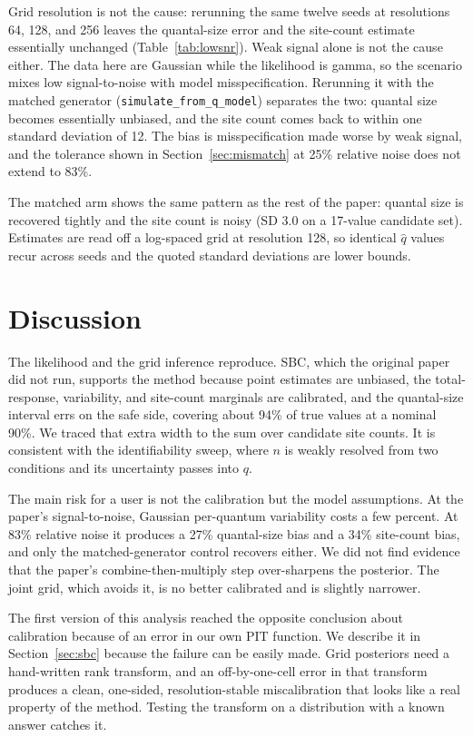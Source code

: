 \documentclass[a4paper, oneside, 10pt]{article}
\begin{document}
Grid resolution is not the cause: rerunning the same twelve seeds at resolutions 64, 128, and 256 leaves the quantal-size error and the site-count estimate essentially unchanged (Table~\ref{tab:lowsnr}). Weak signal alone is not the cause either. The data here are Gaussian while the likelihood is gamma, so the scenario mixes low signal-to-noise with model misspecification. Rerunning it with the matched generator (\texttt{simulate\_from\_q\_model}) separates the two: quantal size becomes essentially unbiased, and the site count comes back to within one standard deviation of 12. The bias is misspecification made worse by weak signal, and the tolerance shown in Section~\ref{sec:mismatch} at 25\% relative noise does not extend to 83\%.

The matched arm shows the same pattern as the rest of the paper: quantal size is recovered tightly and the site count is noisy (SD 3.0 on a 17-value candidate set). Estimates are read off a log-spaced grid at resolution 128, so identical \(\hat q\) values recur across seeds and the quoted standard deviations are lower bounds.

\section{Discussion}

The likelihood and the grid inference reproduce. SBC, which the original paper did not run, supports the method because point estimates are unbiased, the total-response, variability, and site-count marginals are calibrated, and the quantal-size interval errs on the safe side, covering about 94\% of true values at a nominal 90\%. We traced that extra width to the sum over candidate site counts. It is consistent with the identifiability sweep, where \(n\) is weakly resolved from two conditions and its uncertainty passes into \(q\).

The main risk for a user is not the calibration but the model assumptions. At the paper's signal-to-noise, Gaussian per-quantum variability costs a few percent. At 83\% relative noise it produces a 27\% quantal-size bias and a 34\% site-count bias, and only the matched-generator control recovers either. We did not find evidence that the paper's combine-then-multiply step over-sharpens the posterior. The joint grid, which avoids it, is no better calibrated and is slightly narrower.

The first version of this analysis reached the opposite conclusion about calibration because of an error in our own PIT function. We describe it in Section~\ref{sec:sbc} because the failure can be easily made. Grid posteriors need a hand-written rank transform, and an off-by-one-cell error in that transform produces a clean, one-sided, resolution-stable miscalibration that looks like a real property of the method. Testing the transform on a distribution with a known answer catches it.
\end{document}
